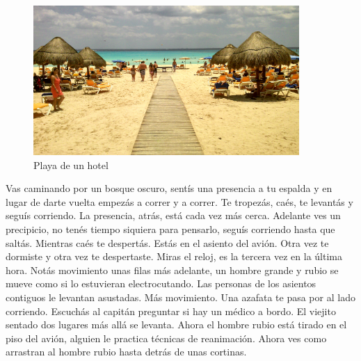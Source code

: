 \documentclass[12pt,twoside,openright,a5paper]{book}
\begin{document}
\begin{figure}[H]
  \centering
    \includegraphics[width=0.9\textwidth]{fotos/2013/hotel}
  \caption{Playa de un hotel}
  \label{Playa de un hotel}
\end{figure}


\vspace{0.5cm}
\hrulefill\hspace{0.2cm} \decofourleft\decofourright \hspace{0.2cm} \hrulefill
\vspace{0.5cm}

Vas caminando por un bosque oscuro, sentís una presencia a tu espalda
y en lugar de darte vuelta empezás a correr y a correr. Te tropezás,
caés, te levantás y seguís corriendo. La presencia, atrás, está cada vez
más cerca. Adelante ves un precipicio, no tenés tiempo siquiera
para pensarlo, seguís corriendo hasta que saltás. Mientras caés te
despertás. Estás en el asiento del avión. Otra vez te dormiste y otra vez
te despertaste. Miras el reloj, es la tercera vez en la última hora. Notás
movimiento unas filas más adelante, un hombre grande y rubio se mueve  como
si lo estuvieran electrocutando. Las personas de los asientos contiguos
le levantan asustadas. Más movimiento. Una azafata te pasa por al lado
corriendo. Escuchás al capitán preguntar si hay un médico a bordo. El
viejito sentado dos lugares más allá se levanta. Ahora el hombre rubio
está tirado en el piso del avión, alguien le practica técnicas de
reanimación. Ahora ves como arrastran al hombre rubio hasta detrás de
unas cortinas.


\vspace{0.5cm}
\hrulefill\hspace{0.2cm} \decofourleft\decofourright \hspace{0.2cm} \hrulefill
\vspace{0.5cm}
\end{document}
